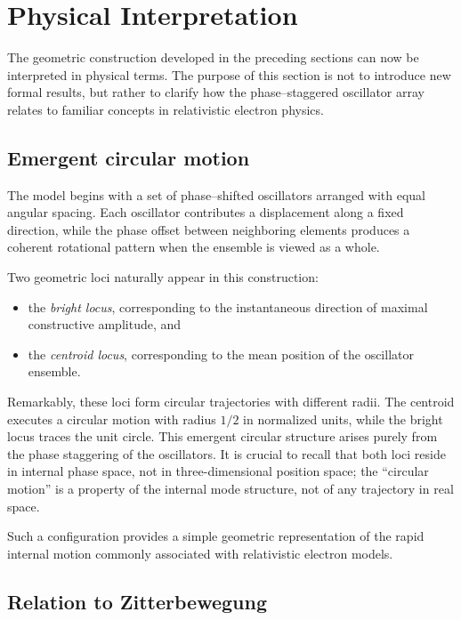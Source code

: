 \documentclass[%
 reprint, amsmath,amssymb, aps, prb, ]{revtex4-2}
\numberwithin{equation}{section}
\begin{document}
\section{Physical Interpretation}
\label{sec:interpretation}

The geometric construction developed in the preceding sections can now be interpreted in physical terms. The purpose of this section is not to introduce new formal results, but rather to clarify how the phase--staggered oscillator array relates to familiar concepts in relativistic electron physics.

\subsection{Emergent circular motion}

The model begins with a set of phase--shifted oscillators arranged with equal angular spacing. Each oscillator contributes a displacement along a fixed direction, while the phase offset between neighboring elements produces a coherent rotational pattern when the ensemble is viewed as a whole.

Two geometric loci naturally appear in this construction:

\begin{itemize}
\item the \emph{bright locus}, corresponding to the instantaneous direction of maximal constructive amplitude, and
\item the \emph{centroid locus}, corresponding to the mean position of the oscillator ensemble.
\end{itemize}

Remarkably, these loci form circular trajectories with different radii. The centroid executes a circular motion with radius $1/2$ in normalized units, while the bright locus traces the unit circle. This emergent circular structure arises purely from the phase staggering of the oscillators. It is crucial to recall that both loci reside in internal phase space, not in three-dimensional position space; the ``circular motion'' is a property of the internal mode structure, not of any trajectory in real space.

Such a configuration provides a simple geometric representation of the rapid internal motion commonly associated with relativistic electron models.

\subsection{Relation to Zitterbewegung}
\end{document}
